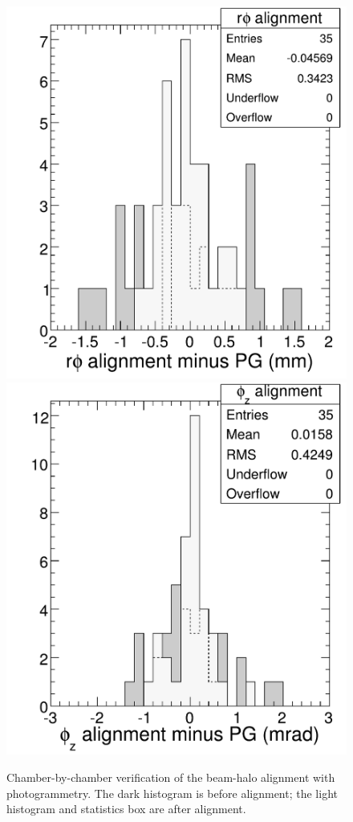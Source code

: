\begin{figure}
\begin{center}
\includegraphics[width=0.35\linewidth]{plots/csc_overlaps_alignment/delta_translations_goodcolors.pdf} \includegraphics[width=0.35\linewidth]{plots/csc_overlaps_alignment/delta_rotations_goodcolors.pdf}
\end{center}
\caption{Chamber-by-chamber verification of the beam-halo alignment with photogrammetry.  The dark histogram is before alignment; the light histogram and statistics box are after alignment. \label{fig:overlaps_data2}}
\end{figure}



